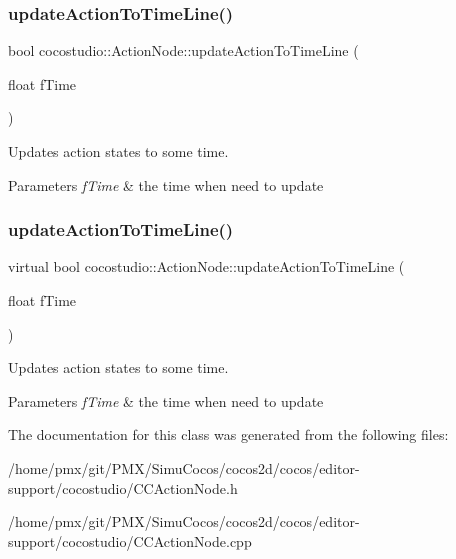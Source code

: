 \subsubsection{\texorpdfstring{update\+Action\+To\+Time\+Line()}{updateActionToTimeLine()}\hspace{0.1cm}{\footnotesize\ttfamily [1/2]}}
{\footnotesize\ttfamily bool cocostudio\+::\+Action\+Node\+::update\+Action\+To\+Time\+Line (\begin{DoxyParamCaption}\item[{float}]{f\+Time }\end{DoxyParamCaption})\hspace{0.3cm}{\ttfamily [virtual]}}

Updates action states to some time.


\begin{DoxyParams}{Parameters}
{\em f\+Time} & the time when need to update \\
\hline
\end{DoxyParams}
\mbox{\label{classcocostudio_1_1ActionNode_a461ce812ca4351642b00b0f3a2364684}} 
\subsubsection{\texorpdfstring{update\+Action\+To\+Time\+Line()}{updateActionToTimeLine()}\hspace{0.1cm}{\footnotesize\ttfamily [2/2]}}
{\footnotesize\ttfamily virtual bool cocostudio\+::\+Action\+Node\+::update\+Action\+To\+Time\+Line (\begin{DoxyParamCaption}\item[{float}]{f\+Time }\end{DoxyParamCaption})\hspace{0.3cm}{\ttfamily [virtual]}}

Updates action states to some time.


\begin{DoxyParams}{Parameters}
{\em f\+Time} & the time when need to update \\
\hline
\end{DoxyParams}


The documentation for this class was generated from the following files\+:\begin{DoxyCompactItemize}
\item 
/home/pmx/git/\+P\+M\+X/\+Simu\+Cocos/cocos2d/cocos/editor-\/support/cocostudio/C\+C\+Action\+Node.\+h\item 
/home/pmx/git/\+P\+M\+X/\+Simu\+Cocos/cocos2d/cocos/editor-\/support/cocostudio/C\+C\+Action\+Node.\+cpp\end{DoxyCompactItemize}
